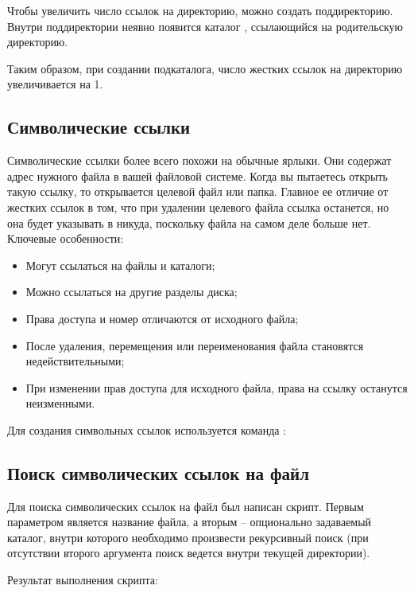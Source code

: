 Чтобы увеличить число ссылок на директорию, можно создать поддиректорию. Внутри поддиректории неявно появится каталог , ссылающийся на родительскую директорию.


Таким образом, при создании подкаталога, число жестких ссылок на директорию увеличивается на 1.

\subsection{Символические ссылки}

Символические ссылки более всего похожи на обычные ярлыки. Они содержат адрес нужного файла в вашей файловой системе. Когда вы пытаетесь открыть такую ссылку, то открывается целевой файл или папка. Главное ее отличие от жестких ссылок в том, что при удалении целевого файла ссылка останется, но она будет указывать в никуда, поскольку файла на самом деле больше нет. Ключевые особенности:
\begin{itemize}
	\item Могут ссылаться на файлы и каталоги;
	\item Можно ссылаться на другие разделы диска;
	\item Права доступа и номер  отличаются от исходного файла;
	\item После удаления, перемещения или переименования файла становятся недействительными;
	\item При изменении прав доступа для исходного файла, права на ссылку останутся неизменными.
\end{itemize}

Для создания символьных ссылок используется команда :


\subsection{Поиск символических ссылок на файл}

Для поиска символических ссылок на файл был написан скрипт. Первым параметром является название файла, а вторым -- опционально задаваемый каталог, внутри которого необходимо произвести рекурсивный поиск (при отсутствии второго аргумента поиск ведется внутри текущей директории).


Результат выполнения скрипта:


